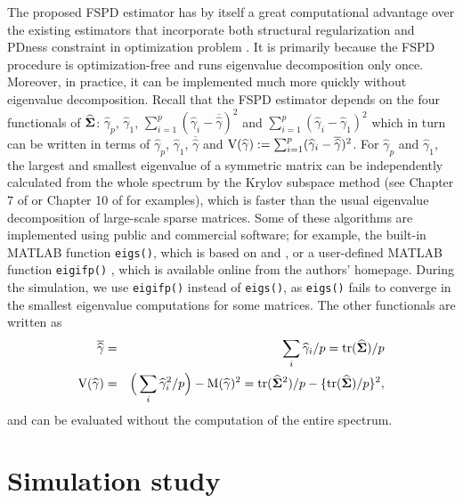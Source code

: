 \documentclass[times,sort&compress,3p]{elsarticle}
\newcommand{\NN}{\nonumber}
\newcommand{\tr}{\mathrm{tr}}
\begin{document}
The proposed FSPD estimator has by itself a great computational advantage over the existing estimators
that incorporate both structural regularization and PDness constraint in optimization problem
\citep{Rothman2012,Xue2012,Liu2014}. It is primarily because the FSPD procedure is optimization-free
and runs eigenvalue decomposition only once. Moreover, in practice, it can be implemented much more quickly without eigenvalue decomposition.
Recall that the FSPD estimator depends on the four functionals of $\widehat{\bf \Sigma}$: $\widehat{\gamma}_{p}$, $\widehat{\gamma}_{1}$, 
$\sum_{i=1}^p ({\widehat{\gamma}}_i - {\overline{\widehat{\gamma}}})^2$ and $\sum_{i=1}^p ({\widehat{\gamma}}_i - {\widehat{\gamma}}_1)^2$ which in turn can be written in terms of 
$\widehat{\gamma}_{p}$, $\widehat{\gamma}_{1}$, $\overline{\widehat{\gamma}}$ 
and ${\rm V}(\widehat{\gamma}) := \sum_{i=1}^p ({\widehat{\gamma}}_i - {\overline{\widehat{\gamma}}})^2$. 
For $\widehat{\gamma}_{p}$ and $\widehat{\gamma}_{1}$, the largest and
smallest eigenvalue of a symmetric matrix
can be independently calculated from the whole spectrum by the Krylov subspace method
(see Chapter 7 of \citet{Demmel1997} or Chapter 10 of \citet{Golub2012} for examples), which
 is faster than the usual eigenvalue decomposition of large-scale sparse matrices. Some of these
 algorithms are implemented using public and commercial software; for example, the built-in \textsf{MATLAB} function
 \texttt{eigs()}, which is based
 on \citet{Lehoucq1996} and \citet{Sorensen1990}, or a user-defined \textsf{MATLAB} function \texttt{eigifp()}
 \citep{Golub2002}, which is available online from the authors' homepage. During the simulation, we use
 \texttt{eigifp()} instead of \texttt{eigs()}, as \texttt{eigs()} fails to converge in the
 smallest eigenvalue computations for some matrices.
The other functionals are  written as
\begin{eqnarray}
{\overline{\widehat{\gamma}}} &=& \sum_i \widehat{\gamma}_i / p = \tr(\widehat{\bf \Sigma}) / p \NN \\
{\rm V}(\widehat{\gamma}) &=& \Big(\sum_i \widehat{\gamma}_i^2 / p \Big) - {\rm M}(\widehat{\gamma})^2 =
\tr(\widehat{\bf \Sigma}^2)/p - \{\tr(\widehat{\bf \Sigma}) /p \}^2, \NN
\end{eqnarray}
and can
be evaluated without the computation of the entire spectrum.


\section{Simulation study}\label{sec:simulation}
\end{document}

